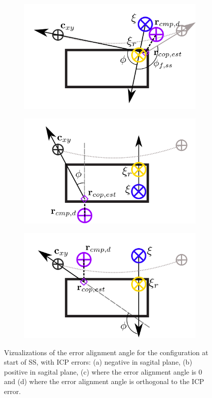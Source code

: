 \begin{figure}[h]
\begin{subfigure}{0.5\textwidth}
    \caption{}
     \label{fig:phiVizc}
  \end{subfigure}
  \begin{subfigure}{0.5\textwidth}
    \centering
  \includegraphics[width=.8\linewidth]{STYLESTUFF/ICPplanStartSSPhiViz90.png}
    \caption{}
     \label{fig:phiVizd}
  \end{subfigure}
    \begin{subfigure}{0.5\textwidth}
    \centering
  \includegraphics[width=.8\linewidth]{STYLESTUFF/ICPplanStartSSPhiVizLeftError.png}
    \caption{}
     \label{fig:phiVize}
  \end{subfigure}
  \begin{subfigure}{0.5\textwidth}
    \centering
  \includegraphics[width=.8\linewidth]{STYLESTUFF/ICPplanStartSSPhiVizRightError.png}
    \caption{}
     \label{fig:phiVizf}
  \end{subfigure}
  \caption{Vizualizations of the error alignment angle for the configuration at start of \ac{SS}, with \ac{ICP} errors: (a) negative in sagital plane, (b) positive in sagital plane, (c) where the error alignment angle is $0$ and (d) where the error alignment angle is orthogonal to the \ac{ICP} error. }
  \label{fig:phiViz}
\end{figure}


